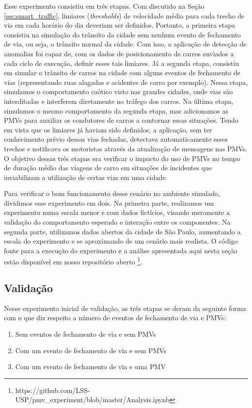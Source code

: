 Esse experimento consistiu em três etapas.
Com discutido na Seção \ref{sec:smart_traffic}, limiares (\textit{thresholds}) de velocidade média para cada trecho de via em cada horário do dia deveriam ser definidos.
Portanto, a primeira etapa consistiu na simulação do trânsito da cidade sem nenhum evento de fechamento de via, ou seja, o trânsito normal da cidade.
Com isso, a aplicação de detecção de anomalias foi capaz de, com os dados de posicionamento de carros enviados a cada ciclo de execução, definir esses tais limiares.
Já a segunda etapa, consistiu em simular o trânsito de carros na cidade com alguns eventos de fechamento de vias (representando ruas alagadas e acidentes de carro por exemplo).
Nessa etapa, simulamos o comportamento caótico visto nas grandes cidades, onde vias são interditadas e interferem diretamente no tráfego dos carros.
Na última etapa, simulamos o mesmo comportamento da segunda etapa, mas adicionamos as PMVs para auxiliar os condutores de carros a contornar essas situações.
Tendo em vista que os limiares já haviam sido definidos, a aplicação, sem ter conhecimento prévio dessas vias fechadas, detectava automaticamente esses trechos e notificava os motoristas através da
atualização de mensagens nas PMVs.
O objetivo dessas três etapas era verificar o impacto do uso de PMVs no tempo de duração médio das viagens de carro em situações de incidentes que inviabilizam a utilização de certas vias em uma cidade.

Para verificar o bom funcionamento desse cenário no ambiente simulado, dividimos esse experimento em dois.
Na primeira parte, realizamos um experimento numa escala menor e com dados fictícios, visando meramente a validação do comportamento esperado e interação entre os componentes.
Na segunda parte, utilizamos dados abertos da cidade de São Paulo, aumentando a escala do experimento e se aproximando de um cenário mais realista.
O código fonte para a execução do experimento e a análise apresentada aqui nesta seção estão disponível em nosso repositório aberto
\footnote{https://github.com/LSS-USP/pmv\_experiment/blob/master/Analysis.ipynb}.

\subsection{Validação}

Nesse experimento inicial de validação, as três etapas se deram da seguinte forma com o que diz respeito a número de eventos de fechamento de via e PMVs:

\begin{enumerate}
    \item Sem eventos de fechamento de via e sem PMVs

    \item Com um evento de fechamento de via e sem PMVs

    \item Com um evento de fechamento de via e uma PMV
\end{enumerate}

